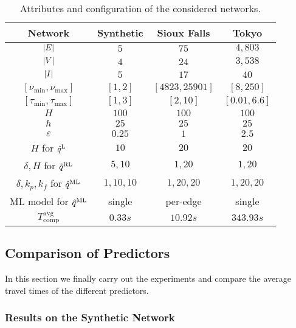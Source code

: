 \begin{table}[h]
    \centering
    \begin{tabular}{c c c c}
        \textbf{Network} & \textbf{Synthetic} & \textbf{Sioux Falls} & \textbf{Tokyo}
        \\
        \hline
        $\left| E \right|$ & $5$ & $75$ &  $4{,}803$
        \\
        $\left| V \right|$ & $4$ & $24$ & $3{,}538$
        \\
        $\left| I \right|$ & $5$ & $17$ & $40$
        \\
        $[\nu_{\min}, \nu_{\max}]$ & $[1,2]$ & $[4823,25901]$ & $[8, 250]$
        \\
        $[\tau_{\min},\tau_{\max}]$ & $[1,3]$ & $[2, 10]$ & $[0.01, 6.6]$
        \\
        $H$ & $100$ & $100$ & $100$
        \\
        $h$ & $25$ & $25$ & $25$
        \\
        $\varepsilon$ & $0{.}25$ & $1$ & $2{.}5$
        \\
        $H$ for $\hat q^{\text{L}}$ & $10$ & $20$ & $20$
        \\
        $\delta,H$ for $\hat q^{\text{RL}}$ & $5,10$ & $1,20$ & $1,20$
        \\
        $\delta,k_p,k_f$ for $\hat q^{\text{ML}}$ & $1,10,10$ & $1,20,20$ & $1,20,20$
        \\
        ML model for $\hat q^{\text{ML}}$ & single & per-edge & single
        \\
        $T^{\mathrm{avg}}_{\mathrm{comp}}$ & $0{.}33s$ & $10{.}92s$ & $343{.}93s$
    \end{tabular}
    \caption{Attributes and configuration of the considered networks.}
    \label{table:network-data}
\end{table}

\subsection{Comparison of Predictors}\label{subsec:comparison-predictors}

In this section we finally carry out the experiments and compare the average travel times of the different predictors.

\subsubsection*{Results on the Synthetic Network}

